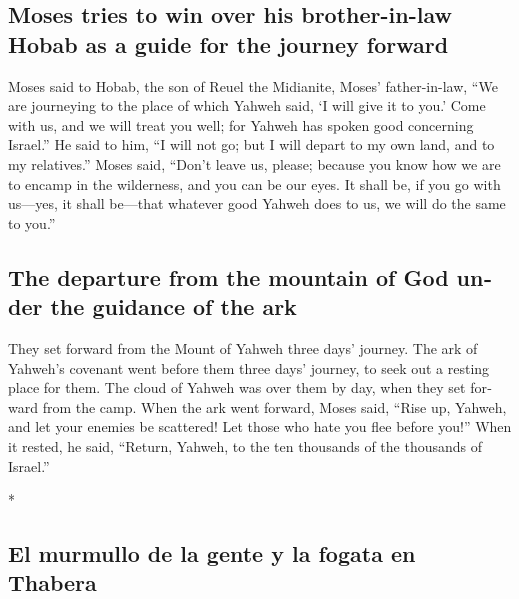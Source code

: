 \begin{paracol}{2}
\begin{otherlanguage}{english}
\hypertarget{moses-tries-to-win-over-his-brother-in-law-hobab-as-a-guide-for-the-journey-forward}{%
\subsection{Moses tries to win over his brother-in-law Hobab as a guide
for the journey
forward}\label{moses-tries-to-win-over-his-brother-in-law-hobab-as-a-guide-for-the-journey-forward}}

 Moses said to Hobab, the son of Reuel the Midianite,
Moses' father-in-law, ``We are journeying to the place of which Yahweh
said, `I will give it to you.' Come with us, and we will treat you well;
for Yahweh has spoken good concerning Israel.''  He said
to him, ``I will not go; but I will depart to my own land, and to my
relatives.''  Moses said, ``Don't leave us, please;
because you know how we are to encamp in the wilderness, and you can be
our eyes.  It shall be, if you go with us---yes, it shall
be---that whatever good Yahweh does to us, we will do the same to you.''

\hypertarget{the-departure-from-the-mountain-of-god-under-the-guidance-of-the-ark}{%
\subsection{The departure from the mountain of God under the guidance of
the
ark}\label{the-departure-from-the-mountain-of-god-under-the-guidance-of-the-ark}}

 They set forward from the Mount of Yahweh three days'
journey. The ark of Yahweh's covenant went before them three days'
journey, to seek out a resting place for them.  The cloud
of Yahweh was over them by day, when they set forward from the camp.
 When the ark went forward, Moses said, ``Rise up,
Yahweh, and let your enemies be scattered! Let those who hate you flee
before you!''  When it rested, he said, ``Return, Yahweh,
to the ten thousands of the thousands of Israel.''

\end{otherlanguage}

\switchcolumn[0]*

\hypertarget{el-murmullo-de-la-gente-y-la-fogata-en-thabera}{%
\subsection{El murmullo de la gente y la fogata en
Thabera}\label{el-murmullo-de-la-gente-y-la-fogata-en-thabera}}


\end{paracol}
